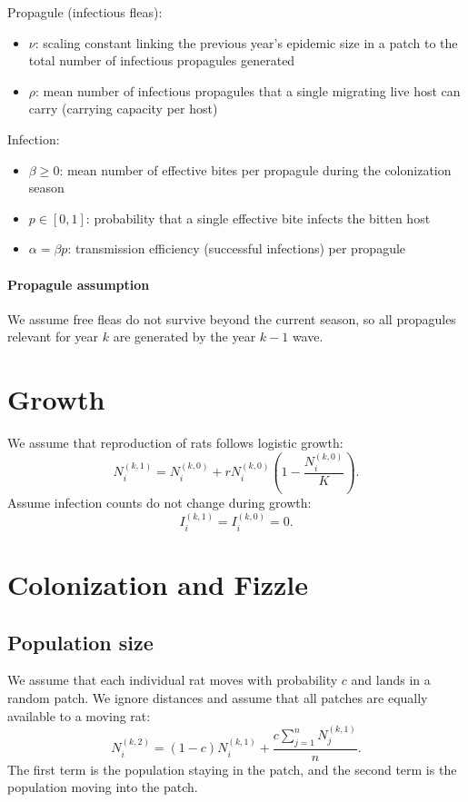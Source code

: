 \documentclass[12pt]{article}
\begin{document}
Propagule (infectious fleas):
\begin{itemize}
\item $\nu$: scaling constant linking the previous year's epidemic size in a patch to the total number of infectious propagules generated
\item $\rho$: mean number of infectious propagules that a single migrating live host can carry (carrying capacity per host)
\end{itemize}

Infection:
\begin{itemize}
\item $\beta \ge 0$: mean number of effective bites per propagule during the colonization season
\item $p\in[0,1]$: probability that a single effective bite infects the bitten host 
\item $\alpha=\beta p$: transmission efficiency (successful infections) per propagule
\end{itemize}

\paragraph{Propagule assumption}
We assume free fleas do not survive beyond the current season, so all propagules relevant for year $k$ are generated by the year $k-1$ wave.

\section{Growth}
We assume that reproduction of rats follows logistic growth:
\begin{equation}
N_i^{(k,1)}=N_i^{(k,0)}+rN_i^{(k,0)}\left(1-\frac{N_i^{(k,0)}}{K}\right).
\end{equation}
Assume infection counts do not change during growth:
\begin{equation}
I_i^{(k,1)} = I_i^{(k,0)}=0.
\end{equation}

\section{Colonization and Fizzle}
\subsection{Population size}
We assume that each individual rat moves with probability $c$ and lands in a random patch.
We ignore distances and assume that all patches are equally available to a moving rat:
\begin{equation}
N_i^{(k,2)}=(1-c)N_i^{(k,1)}+\frac{c\sum_{j=1}^n N_j^{(k,1)}}{n}.
\end{equation}
The first term is the population staying in the patch, and the second term is the population moving into the patch.
\end{document}

